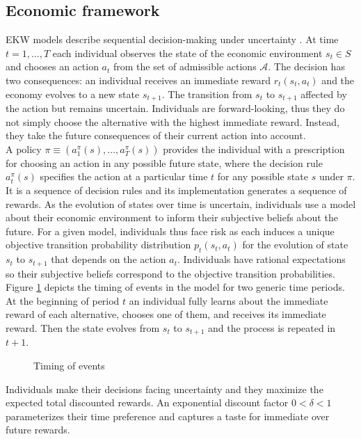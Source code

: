 \subsection{Economic framework}
EKW models describe sequential decision-making under uncertainty \citep{Gilboa.2009,Machina.2014}. At time $t = 1, \hdots, T$ each individual observes the state of the economic environment $s_t\in S$ and chooses an action $a_t$ from the set of admissible actions $\mathcal{A}$. The decision has two consequences: an individual receives an immediate reward $r_t(s_t, a_t)$ and the economy evolves to a new state $s_{t + 1}$. The transition from $s_t$ to $s_{t + 1}$ affected by the action but remains uncertain. Individuals are forward-looking, thus they do not simply choose the alternative with the highest immediate reward. Instead, they take the future consequences of their current action into account.\\

\noindent A policy $\pi \equiv(a^\pi_1(s), \hdots, a^\pi_T(s))$ provides the individual with a prescription for choosing an action in any possible future state, where the decision rule $a^\pi_t(s)$ specifies the action at a particular time $t$ for any possible state $s$ under $\pi$. It is a sequence of decision rules and its implementation generates a sequence of rewards.  As the evolution of states over time is uncertain, individuals use a model about their economic environment to inform their subjective beliefs about the future. For a given model, individuals thus face risk as each induces a unique objective transition probability distribution $p_t(s_t, a_t)$ for the evolution of state $s_t$ to $s_{t + 1}$ that depends on the action $a_t$. Individuals have rational expectations \citep{Lucas.1972,Muth.1961} so their subjective beliefs correspond to the objective transition probabilities.\\

\noindent Figure \ref{Timing} depicts the timing of events in the model for two generic time periods. At the beginning of period $t$ an individual fully learns about the immediate reward of each alternative, chooses one of them, and receives its immediate reward. Then the state evolves from $s_t$ to $s_{t + 1}$ and the process is repeated in $t + 1$.
%
\begin{figure}\caption{Timing of events}\label{Timing}\vspace{1.0cm}\centering

\end{figure}
%
\noindent Individuals make their decisions facing uncertainty and they maximize the expected total discounted rewards. An exponential discount factor $0 < \delta < 1$ parameterizes their time preference and captures a taste for immediate over future rewards.\\

